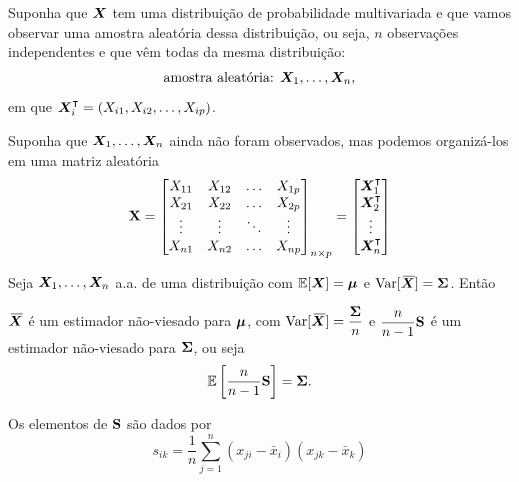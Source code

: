 \begin{definition}
	Suponha que $\bm{X}$ tem uma distribuição de probabilidade multivariada e que vamos observar uma amostra aleatória dessa distribuição, ou seja, $n$ observações independentes e que vêm todas da mesma distribuição:
	\begin{equation}
		\text{amostra aleatória: } \bm{X}_1,\ldots,\bm{X}_n,
	\end{equation}
	em que $\v{X}_i\T = (X_{i1}, X_{i2}, \ldots, X_{ip})$.
\end{definition}


\begin{definition}
	Suponha que $\bm{X}_1,\ldots,\bm{X}_n$ ainda não foram observados, mas podemos organizá-los em uma matriz aleatória
	\begin{equation}
		\m{X} =
		\begin{bmatrix}
			X_{11} & X_{12} & \ldots & X_{1p} \\
			X_{21} & X_{22} & \ldots & X_{2p} \\
			\vdots & \vdots & \ddots & \vdots \\
			X_{n1} & X_{n2} & \ldots & X_{np}
		\end{bmatrix}_{n\times p}
		=
		\begin{bmatrix}
			\v{X}_1\T \\
			\v{X}_2\T \\
			\vdots \\
			\v{X}_n\T
		\end{bmatrix}
	\end{equation}
\end{definition}

\begin{theorem}
	Seja $\bm{X}_1,\ldots,\bm{X}_n$ a.a. de uma distribuição com $\operatorname{\mathbb{E}}[\bm{X}] = \bm{\mu}$ e $\operatorname{Var}[\,\overline{\!{\bm{X}}}] = \mathbf{\Sigma}$. Então
	\begin{outline}[enumerate]
		\1 $\,\overline{\!{\bm{X}}}$ é um estimador não-viesado para $\bm{\mu}$, com $\operatorname{Var}[\,\overline{\!{\bm{X}}}] = \dfrac{\mathbf{\Sigma}}{n}$ e
		\1 $\dfrac{n}{n-1}\mathbf{S}$ é um estimador não-viesado para $\mathbf{\Sigma}$, ou seja
		\begin{equation}
			\operatorname{\mathbb{E}}\left[\frac{n}{n-1}\mathbf{S}\right] = \mathbf{\Sigma}.
		\end{equation}
	\end{outline}
	\begin{note}
		\leavevmode
		\begin{outline}[enumerate]
			\1 Os elementos de $\mathbf{S}$ são dados por
			\begin{equation}
				s_{ik} = \frac{1}{n}\sum_{j=1}^n (x_{ji}-\bar{x}_i)(x_{jk}-\bar{x}_k)
			\end{equation}
		\end{outline}
	\end{note}
\end{theorem}
